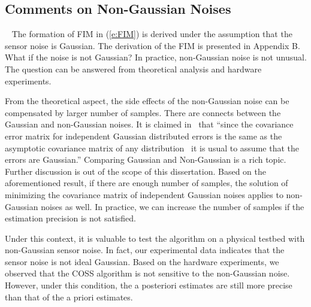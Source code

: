 \subsection{Comments on Non-Gaussian Noises}~\label{s:gauss}
The formation of FIM in (\ref{e:FIM}) is derived under the assumption that the sensor noise is Gaussian. The derivation of the FIM is presented in Appendix B. What if the noise is not Gaussian?
 In practice, non-Gaussian noise is not unusual.
    The question can be answered from theoretical analysis and hardware experiments.

From the theoretical aspect, the side effects of the non-Gaussian noise can be compensated by larger number of samples.
    There are connects between the Gaussian and non-Gaussian noises. It is claimed in~\cite{EmeryOED98} that ``since the covariance error matrix for independent Gaussian distributed errors is the same as the asymptotic covariance matrix of any distribution~\cite{Goodwin1977} it is usual to assume that the errors are Gaussian.''  Comparing Gaussian and Non-Gaussian is a rich topic. Further discussion is out of the scope of this dissertation.
        Based on the aforementioned result, if there are enough number of samples, the solution of minimizing the covariance matrix of independent Gaussian noises applies to non-Gaussian noises as well.
         In practice, we can increase the number of samples if the estimation precision is not satisfied.


Under this context, it is valuable to test the algorithm on a physical testbed with non-Gaussian sensor noise. In fact, our experimental data indicates that the sensor noise is not ideal Gaussian.
 Based on the hardware experiments, we observed that the COSS algorithm is not sensitive to the non-Gaussian noise.  However, under this condition, the a posteriori estimates are still more precise than that of the a priori estimates.

